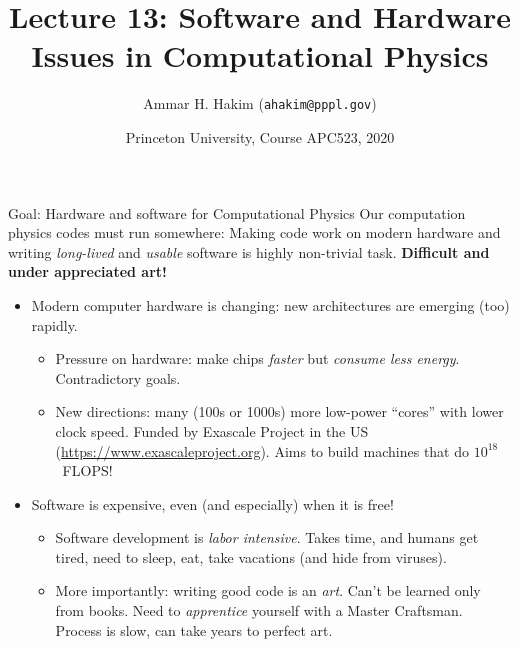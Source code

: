 \documentclass[aspectratio=169]{beamer}
\title[{\tt }] {Lecture 13: Software and Hardware Issues in Computational Physics}%
\author[https://apc523-2020.rtfd.io]%
{Ammar H. Hakim ({\tt ahakim@pppl.gov}) \inst{1}}%
\institute[PPPL]
{ \inst{1} Princeton Plasma Physics Laboratory, Princeton, NJ %
}
\date[3/23/2020]{Princeton University, Course APC523, 2020}
\newcommand{\mypause}{\pause}
\newcommand{\cramplist}{
	\setlength{\itemsep}{0in}
	\setlength{\partopsep}{0in}
	\setlength{\topsep}{0in}}
\begin{document}
\begin{frame}[plain]
  \titlepage
\end{frame}

\begin{frame}{Goal: Hardware and software for Computational Physics}
  Our computation physics codes must run somewhere: Making code work
  on modern hardware and writing \emph{long-lived} and \emph{usable}
  software is highly non-trivial task. {\bf Difficult
    and under appreciated art!}
  \mypause%
  \begin{itemize}
  \item Modern computer hardware is changing: new architectures are
    emerging (too) rapidly.
    \begin{itemize}\cramplist
    \item Pressure on hardware: make chips \emph{faster} but
      \emph{consume less energy}. Contradictory goals.
    \item New directions: many (100s or 1000s) more low-power
      ``cores'' with lower clock speed. Funded by Exascale Project in
      the US (\url{https://www.exascaleproject.org}). Aims to build
      machines that do $10^{18}$~FLOPS!
    \end{itemize}
      \mypause%
  \item Software is expensive, even (and especially) when it is free!
    \begin{itemize}\cramplist
    \item Software development is \emph{labor intensive}. Takes time,
      and humans get tired, need to sleep, eat, take vacations (and
      hide from viruses).
    \item More importantly: writing good code is an \emph{art}. Can't
      be learned only from books. Need to \emph{apprentice} yourself
      with a Master Craftsman. Process is slow, can take years to
      perfect art.
    \end{itemize}
  \end{itemize}
\end{frame}
\end{document}
